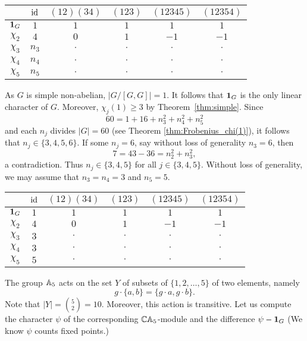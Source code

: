\bigskip 
\begin{center}
        \begin{tabular}{|c|ccccc|}
        \hline  
         & $\operatorname{id}$ & $(12)(34)$ & $(123)$ & $(12345)$ & $(12354)$\\
        \hline 
        $\mathbf{1}_G$ & $1$ & $1$ & $1$ & $1$ & $1$\\
        $\chi_2$ & $4$ & $0$ & $1$ & $-1$ & $-1$\\
        $\chi_3$ & $n_3$ & $\cdot$ & $\cdot$ & $\cdot$& $\cdot$\\
        $\chi_4$ & $n_4$ & $\cdot$ & $\cdot$ & $\cdot$& $\cdot$\\
        $\chi_5$ & $n_5$ & $\cdot$ & $\cdot$ & $\cdot$& $\cdot$\\
        \hline 
    \end{tabular}
\end{center}
\bigskip 

As $G$ is simple non-abelian, 
$|G/[G,G]|=1$. It follows that
$\mathbf{1}_G$ is the only linear character of $G$. Moreover, 
$\chi_j(1)\geq3$ by Theorem~\ref{thm:simple}. Since 
\[
60=1+16+n_3^2+n_4^2+n_5^2
\]
and each $n_j$ divides $|G|=60$ 
(see Theorem \ref{thm:Frobenius_chi(1)}), it follows that 
$n_j\in\{3,4,5,6\}$. If some $n_j=6$, say without
loss of generality $n_3=6$, then 
\[
7=43-36=n_2^2+n_3^2, 
\]
a contradiction. Thus $n_j\in\{3,4,5\}$ for 
all $j\in\{3,4,5\}$. Without loss of generality, 
we may assume that $n_3=n_4=3$ and $n_5=5$. 

\bigskip 
\begin{center}
        \begin{tabular}{|c|ccccc|}
        \hline  
         & $\operatorname{id}$ & $(12)(34)$ & $(123)$ & $(12345)$ & $(12354)$\\
        \hline 
        $\mathbf{1}_G$ & $1$ & $1$ & $1$ & $1$ & $1$\\
        $\chi_2$ & $4$ & $0$ & $1$ & $-1$ & $-1$\\
        $\chi_3$ & $3$ & $\cdot$ & $\cdot$ & $\cdot$& $\cdot$\\
        $\chi_4$ & $3$ & $\cdot$ & $\cdot$ & $\cdot$& $\cdot$\\
        $\chi_5$ & $5$ & $\cdot$ & $\cdot$ & $\cdot$& $\cdot$\\
        \hline 
    \end{tabular}
\end{center}
\bigskip 

The group $\mathbb{A}_5$ acts on the set $Y$ of subsets 
of $\{1,2,\dots,5\}$ of two elements, namely
\[
g\cdot \{a,b\}=\{g\cdot a,g\cdot b\}.
\]
Note that $|Y|=\binom{5}{2}=10$. Moreover, 
this action is transitive. Let us compute 
the character $\psi$ of the corresponding 
$\mathbb{C}\mathbb{A}_5$-module and the difference 
$\psi-\mathbf{1}_G$ (We know $\psi$ counts
fixed points.)

